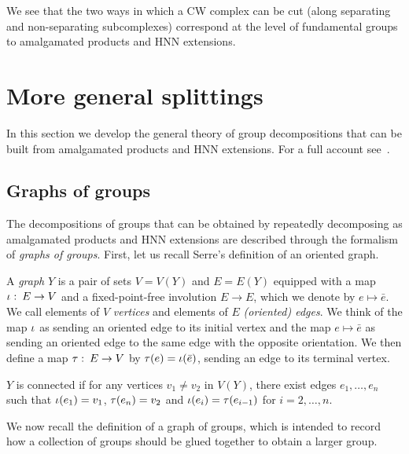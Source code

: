 We see that the two ways in which a CW complex can be cut (along separating and non-separating subcomplexes) correspond at the level of fundamental groups to amalgamated products and HNN extensions.

\section{More general splittings}\label{section:splittings}

In this section we develop the general theory of group decompositions that can be built from amalgamated products and HNN extensions.
For a full account see~\cite{serre77}.

\subsection{Graphs of groups}

The decompositions of groups that can be obtained by repeatedly decomposing as amalgamated products and HNN extensions are described through the formalism of \emph{graphs of groups}.
First, let us recall Serre's definition of an oriented graph.

\begin{definition}\label{definition:serre_graph}
  A \emph{graph} $Y$ is a pair of sets $V = V(Y)$ and $E = E(Y)$ equipped with a map $\operatorname{\iota} \operatorname{\colon} E \to V$ and a fixed-point-free involution $E \to E$, which we denote by $e \mapsto \bar{e}$. 
  We call elements of $V$ \emph{vertices} and elements of $E$ \emph{(oriented) edges}. 
  We think of the map $\operatorname{\iota}$ as sending an oriented edge to its initial vertex and the map $e \mapsto\bar{e}$ as sending an oriented edge to the same edge with the opposite orientation. 
  We then define a map $\operatorname{\tau} \operatorname{\colon} E \to V$ by $\operatorname{\tau}(e) = \operatorname{\iota}(\bar{e})$, sending an edge to its terminal vertex.

  $Y$ is connected if for any vertices $v_1 \neq v_2$ in $V(Y)$, there exist edges $e_1, \dotsc, e_n$ such that $\operatorname{\iota}(e_1) = v_1$, $\operatorname{\tau}(e_n) = v_2$ and $\operatorname{\iota}(e_i) = \operatorname{\tau}(e_{i-1})$ for $i = 2, \dotsc, n$.
\end{definition}

We now recall the definition of a graph of groups, which is intended to record how a collection of groups should be glued together to obtain a larger group.

